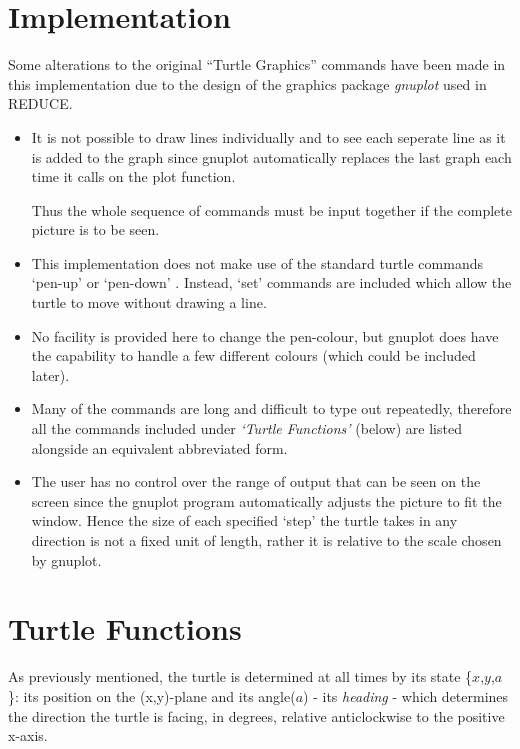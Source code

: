 \section{Implementation}
Some alterations to the original ``Turtle Graphics'' commands have been
made in this implementation due to the design of the graphics package
{\em gnuplot} used in {\small REDUCE}.

\begin{itemize}
 \item It is not possible to draw lines individually and to see each
        seperate line as it is added to the graph since gnuplot
        automatically replaces the last graph each time it calls on
        the plot function.

       Thus the whole sequence of commands must be input together if
        the complete picture is to be seen.
 \item This implementation does not make use of the standard turtle
        commands `pen-up' or `pen-down' . Instead, `set' commands are
        included which allow the turtle to move without drawing a line.
 \item No facility is provided here to change the pen-colour, but gnuplot
        does have the capability to handle a few different colours (which
        could be included later).
 \item Many of the commands are long and difficult to type out repeatedly,
        therefore all the commands included under {\em `Turtle Functions'}
        (below) are listed alongside an equivalent abbreviated form.
 \item The user has no control over the range of output that can be seen
        on the screen since the gnuplot program automatically adjusts the
        picture to fit the window. Hence the size of each specified `step'
        the turtle takes in any direction is not a fixed unit of length,
        rather it is relative to the scale chosen by gnuplot.
\end{itemize}


\section{Turtle Functions}
 As previously mentioned, the turtle is determined at all times by its
state \{$x$,$y$,$a$\}: its position on the \mbox{(x,y)-plane} and its
angle($a$) - its {\em heading} - which determines the direction the
turtle is facing, in degrees, relative anticlockwise to the positive
x-axis.     
       
